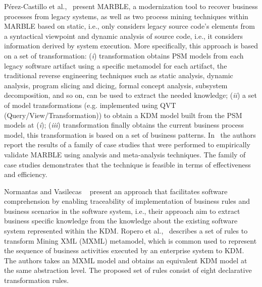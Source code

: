 P\'{e}rez-Castillo et al.,~\cite{Perez-Castillo:2011:ECS:1982185.1982249,6080834, 6498507,Perez-Castillo:2010:IBP:1875847.1875861,5871783} present MARBLE, a modernization tool to recover business processes from legacy systems, as well as two process mining techniques within MARBLE based on static, i.e., only considers legacy source code's elements from a syntactical viewpoint and dynamic analysis of source code, i.e., it considers information derived by system execution. More specifically, this approach is based on a set of transformation: (\textit{i}) transformation obtains PSM models from each legacy software artifact using a specific metamodel for each artifact, the traditional reverse engineering techniques such as static analysis, dynamic analysis, program slicing and dicing, formal concept analysis, subsystem decomposition, and so on, can be used to extract the needed knowledge; (\textit{ii}) a set of model transformations (e.g. implemented using QVT (Query/View/Transformation)) to obtain a KDM model built from the PSM models at (\textit{i}); (\textit{iii}) transformation finally obtains the current business process model, this transformation is based on a set of business patterns. In~\cite{PerezCastillo20121370} the authors report the results of a family of case studies that were performed to empirically validate MARBLE using analysis and meta-analysis techniques. The family of case studies demonstrates that the technique is feasible in terms of effectiveness and efficiency. %

Normantas and Vasilecas ~\cite{lastDAyOFMyLife} present an approach that facilitates software comprehension by enabling traceability of implementation of business rules and business scenarios in the software system, i.e., their approach aim to extract business specific knowledge from the knowledge about the existing software system represented within the KDM. Ropero et al.,~\cite{Fernandez-Ropero:2012:EAB:2367051.2367064} describes a set of rules to transform Mining XML (MXML) metamodel, which is common used to represent the sequence of business activities executed by an enterprise system to KDM. The authors takes an MXML model and obtains an equivalent KDM model at the same abstraction level. The proposed set of rules consist of eight declarative transformation rules. 


